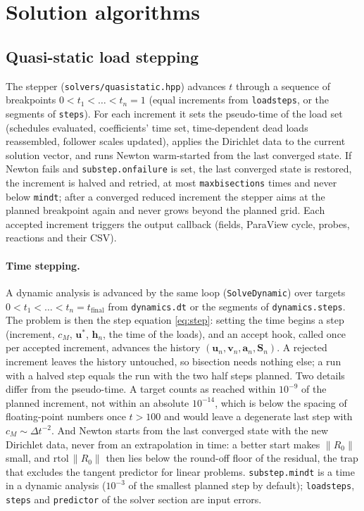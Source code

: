 \documentclass[11pt]{article}
\DeclareRobustCommand{\code}[1]{{\def\_{\textunderscore\allowbreak}\texttt{#1}}}
\DeclareRobustCommand{\file}[1]{{\def\_{\textunderscore\allowbreak}\texttt{#1}}}
\begin{document}
\section{Solution algorithms}
\label{sec:solvers}

\subsection{Quasi-static load stepping}
\label{sec:loadstepping}

The stepper (\file{solvers/quasi\_static.hpp}) advances $t$ through a
sequence of breakpoints $0 < t_1 < \dots < t_n = 1$ (equal increments from
\code{load\_steps}, or the segments of \code{steps}).  For each increment
it sets the pseudo-time of the load set (schedules evaluated, coefficients'
time set, time-dependent dead loads reassembled, follower scales updated),
applies the Dirichlet data to the current solution vector, and runs Newton
warm-started from the last converged state.  If Newton fails and
\code{substep.on\_failure} is set, the last converged state is restored,
the increment is halved and retried, at most \code{max\_bisections} times
and never below \code{min\_dt}; after a converged reduced increment the
stepper aims at the planned breakpoint again and never grows beyond the
planned grid.  Each accepted increment triggers the output callback
(fields, ParaView cycle, probes, reactions and their CSV).

\paragraph{Time stepping.}
A dynamic analysis is advanced by the same loop (\code{SolveDynamic}) over
targets $0 < t_1 < \dots < t_n = t_{\text{final}}$ from \code{dynamics.dt}
or the segments of \code{dynamics.steps}.  The problem is then the step
equation \eqref{eq:step}: setting the time begins a step (increment,
$c_M$, $\bm u^*$, $\bm h_n$, the time of the loads), and an accept hook,
called once per accepted increment, advances the history
$(\bm u_n, \bm v_n, \bm a_n, \bm S_n)$.  A rejected increment leaves the
history untouched, so bisection needs nothing else; a run with a halved
step equals the run with the two half steps planned.  Two details differ
from the pseudo-time.  A target counts as reached within $10^{-9}$ of the
planned increment, not within an absolute $10^{-14}$, which is below the
spacing of floating-point numbers once $t > 100$ and would leave a
degenerate last step with $c_M \sim \Delta t^{-2}$.  And Newton starts from
the last converged state with the new Dirichlet data, never from an
extrapolation in time: a better start makes $\|R_0\|$ small, and
$\text{rtol}\,\|R_0\|$ then lies below the round-off floor of the residual,
the trap that excludes the tangent predictor for linear problems.
\code{substep.min\_dt} is a time in a dynamic analysis ($10^{-3}$ of the
smallest planned step by default); \code{load\_steps}, \code{steps} and
\code{predictor} of the solver section are input errors.
\end{document}
